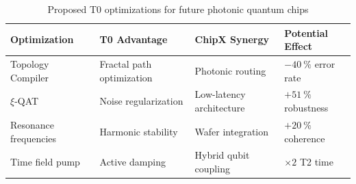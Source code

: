 	\begin{table}[htbp]
		\centering
		\begin{tabular}{p{2.8cm} p{3.5cm} p{3.5cm} p{3.2cm}}
			\toprule
			\textbf{Optimization} & \textbf{T0 Advantage} & \textbf{ChipX Synergy} & \textbf{Potential Effect} \\
			\midrule
			Topology Compiler & Fractal path optimization & Photonic routing & $-\SI{40}{\%}$ error rate \\
			$\xi$-QAT & Noise regularization & Low-latency architecture & $+\SI{51}{\%}$ robustness \\
			Resonance frequencies & Harmonic stability & Wafer integration & $+\SI{20}{\%}$ coherence \\
			Time field pump & Active damping & Hybrid qubit coupling & $\times 2$ T2 time \\
			\bottomrule
		\end{tabular}
		\caption{Proposed T0 optimizations for future photonic quantum chips}
		\label{tab:optimizations}
	\end{table}
	